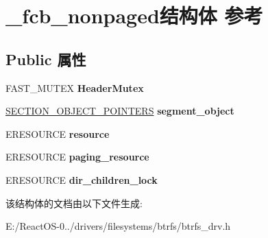 \hypertarget{struct__fcb__nonpaged}{}\section{\+\_\+fcb\+\_\+nonpaged结构体 参考}
\label{struct__fcb__nonpaged}
\subsection*{Public 属性}
\begin{DoxyCompactItemize}
\item 
\mbox{\label{struct__fcb__nonpaged_a7394f7452f9b4a8b5f486e4df3977d2c}} 
F\+A\+S\+T\+\_\+\+M\+U\+T\+EX {\bfseries Header\+Mutex}
\item 
\mbox{\label{struct__fcb__nonpaged_a8c5a913cea8174641d724ba15ce18dd1}} 
\hyperlink{struct___s_e_c_t_i_o_n___o_b_j_e_c_t___p_o_i_n_t_e_r_s}{S\+E\+C\+T\+I\+O\+N\+\_\+\+O\+B\+J\+E\+C\+T\+\_\+\+P\+O\+I\+N\+T\+E\+RS} {\bfseries segment\+\_\+object}
\item 
\mbox{\label{struct__fcb__nonpaged_a2c074602ddff9716149ad96aff54e8f8}} 
E\+R\+E\+S\+O\+U\+R\+CE {\bfseries resource}
\item 
\mbox{\label{struct__fcb__nonpaged_accced50c522e5d8775361b8e2a944dc4}} 
E\+R\+E\+S\+O\+U\+R\+CE {\bfseries paging\+\_\+resource}
\item 
\mbox{\label{struct__fcb__nonpaged_a8c1d36b63f1a7119492756337ff90827}} 
E\+R\+E\+S\+O\+U\+R\+CE {\bfseries dir\+\_\+children\+\_\+lock}
\end{DoxyCompactItemize}


该结构体的文档由以下文件生成\+:\begin{DoxyCompactItemize}
\item 
E\+:/\+React\+O\+S-\/0../drivers/filesystems/btrfs/btrfs\+\_\+drv.\+h\end{DoxyCompactItemize}
